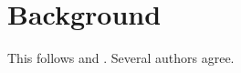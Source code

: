 \documentclass{article}
\begin{document}
\section{Background}
This follows \textcite{knuth1984} and \parencite[see][p.~10]{lamport1978}.
Several authors \autocite{hoare1969,liskov1987} agree.
\printbibliography
\end{document}
